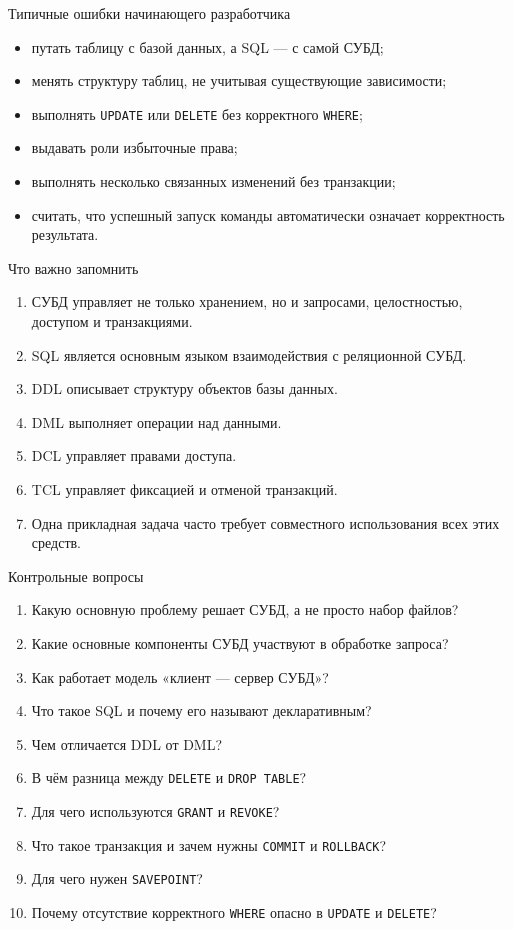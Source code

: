 \documentclass[aspectratio=169]{beamer}
\begin{document}
\begin{frame}{Типичные ошибки начинающего разработчика}
\begin{itemize}
  \item путать таблицу с базой данных, а SQL — с самой СУБД;
  \item менять структуру таблиц, не учитывая существующие зависимости;
  \item выполнять \texttt{UPDATE} или \texttt{DELETE} без корректного \texttt{WHERE};
  \item выдавать роли избыточные права;
  \item выполнять несколько связанных изменений без транзакции;
  \item считать, что успешный запуск команды автоматически означает корректность результата.
\end{itemize}
\end{frame}

\begin{frame}{Что важно запомнить}
\begin{enumerate}
  \item СУБД управляет не только хранением, но и запросами, целостностью, доступом и транзакциями.
  \item SQL является основным языком взаимодействия с реляционной СУБД.
  \item DDL описывает структуру объектов базы данных.
  \item DML выполняет операции над данными.
  \item DCL управляет правами доступа.
  \item TCL управляет фиксацией и отменой транзакций.
  \item Одна прикладная задача часто требует совместного использования всех этих средств.
\end{enumerate}
\end{frame}

\begin{frame}{Контрольные вопросы}
\small
\begin{enumerate}
  \item Какую основную проблему решает СУБД, а не просто набор файлов?
  \item Какие основные компоненты СУБД участвуют в обработке запроса?
  \item Как работает модель «клиент — сервер СУБД»?
  \item Что такое SQL и почему его называют декларативным?
  \item Чем отличается DDL от DML?
  \item В чём разница между \texttt{DELETE} и \texttt{DROP TABLE}?
  \item Для чего используются \texttt{GRANT} и \texttt{REVOKE}?
  \item Что такое транзакция и зачем нужны \texttt{COMMIT} и \texttt{ROLLBACK}?
  \item Для чего нужен \texttt{SAVEPOINT}?
  \item Почему отсутствие корректного \texttt{WHERE} опасно в \texttt{UPDATE} и \texttt{DELETE}? 
\end{enumerate}
\end{frame}
\end{document}
